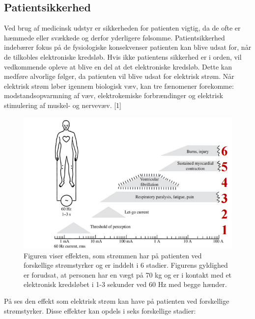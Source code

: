 \subsection{Patientsikkerhed}
Ved brug af medicinsk udstyr er sikkerheden for patienten vigtig, da de ofte er hæmmede eller svækkede og derfor yderligere følsomme. Patientsikkerhed indebærer fokus på de fysiologiske konsekvenser patienten kan blive udsat for, når de tilkobles elektroniske kredsløb. Hvis ikke patientens sikkerhed er i orden, vil vedkommende opleve at blive en del at det elektroniske kredsløb. Dette kan medføre alvorlige følger, da patienten vil blive udsat for elektrisk strøm. Når elektrisk strøm løber igennem biologisk væv, kan tre fænomener forekomme: modstandsopvarmning af væv, elektrokemiske forbrændinger og elektrisk stimulering af muskel- og nervevæv. [1] 
\begin{figure}[H]
	\centering
	\includegraphics[scale=0.7]{figures/bProblemanalyse/Patientsikkerhed.png}
	\caption{Figuren viser effekten, som strømmen har på patienten ved forskellige strømstyrker og er inddelt i 6 stadier. Figurens gyldighed er forudsat, at personen har en vægt på 70 kg og er i kontakt med et elektronisk kredsløbet i 1-3 sekunder ved 60 Hz med begge hænder. }
	\label{Patientsikkerhed}
\end{figure}

På  ses den effekt som elektrisk strøm kan have på patienten ved forskellige strømstyrker. Disse effekter kan opdels i seks forskellige stadier:

